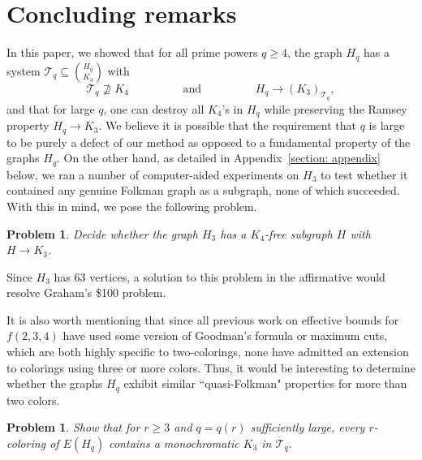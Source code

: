 \documentclass[A4paper,reqno,oneside,12pt]{amsart}
\theoremstyle{plain}
\newtheorem{problem}[theorem]{Problem}
\theoremstyle{definition}
\newcommand{\scT}{\mathscr{T}}
\begin{document}

\section{Concluding remarks}
\label{section: conclusion}

In this paper, we showed that for all prime powers $q \geq 4$, the graph $H_q$ has a system $\scT_q \subseteq \binom{H_q}{K_3}$ with
\begin{equation*}
    \scT_q \nsupseteq K_4 \hspace{2cm} \text{and} \hspace{2cm} H_q \longrightarrow (K_3)_{\scT_q},
\end{equation*}
and that for large $q$, one can destroy all $K_4$'s in $H_q$ while preserving the Ramsey property $H_q \longrightarrow K_3$.
We believe it is possible that the requirement that $q$ is large to be purely a defect of our method as opposed to a fundamental property of the graphs $H_q$.
On the other hand, as detailed in Appendix~\ref{section: appendix} below, we ran a number of computer-aided experiments on $H_3$ to test whether it contained any genuine Folkman graph as a subgraph, none of which succeeded.
With this in mind, we pose the following problem.
\begin{problem}
\label{problem: true-folkman}
    Decide whether the graph $H_3$ has a $K_4$-free subgraph $H$ with $H \longrightarrow K_3$.
\end{problem}
\noindent
Since $H_3$ has 63 vertices, a solution to this problem in the affirmative would resolve Graham's \$100 problem.

It is also worth mentioning that since all previous work on effective bounds for $f(2,3,4)$ have used some version of Goodman's formula or maximum cuts, which are both highly specific to two-colorings, none have admitted an extension to colorings using three or more colors.
Thus, it would be interesting to determine whether the graphs $H_q$ exhibit similar ``quasi-Folkman" properties for more than two colors.

\begin{problem}
\label{pr: multicolor}
    Show that for $r \geq 3$ and $q = q(r)$ sufficiently large, every $r$-coloring of $E(H_q)$ contains a monochromatic $K_3$ in $\scT_q$.
\end{problem}
\end{document}
